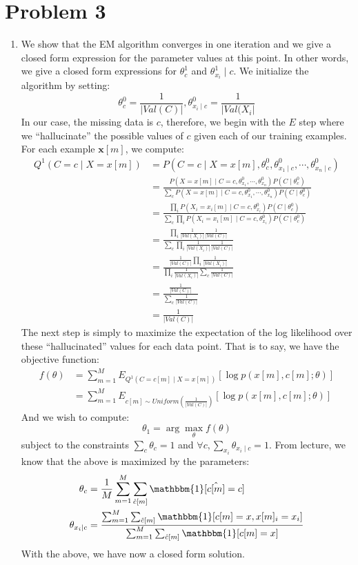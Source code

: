 \documentclass[12pt]{article}
\newcommand{\vect}[1]{\boldsymbol{#1}}
\begin{document}
\section*{Problem 3}

\begin{enumerate}[label=(\alph*)]
	\item We show that the EM algorithm converges in one iteration and we give a closed form expression for the parameter values at this point. In other words, we give a closed form expressions for $\theta_c^1$ and $\theta^1_{x_i} \mid c$. We initialize the algorithm by setting:
	$$
		\theta_c^0 = \frac{1}{|Val(C)|}, \theta_{x_i \mid c}^0 = \frac{1}{|Val(X_i|}
	$$
	In our case, the missing data is $c$, therefore, we begin with the $E$ step where we ``hallucinate'' the possible values of $c$ given each of our training examples. For each example $\vect{x}[m]$, we compute:
	\begin{align*}
		Q^1(C = c \mid X = x[m]) &= P(C = c \mid X = x[m], \theta^0_c, \theta^0_{x_1 \mid c}, \cdots, \theta^0_{x_n \mid c}) \\
		&= \frac{P(X = x[m] \mid C = c, \theta^0_{x_1}, \cdots,\theta^0_{x_n})P(C \mid \theta^0_c)}{\sum_{c} P(X = x[m] \mid C = c, \theta^0_{x_1}, \cdots, \theta^0_{x_n})P(C \mid \theta^0_c)} \tag{Bayes Rule and Conditional Independence} \\
		&= \frac{\prod_i P(X_i = x_i[m] \mid C = c, \theta^0_{x_i})P(C \mid \theta_c^0)}{\sum_c \prod_i P(X_i = x_i[m] \mid C = c, \theta^0_{x_i})P(C \mid \theta_c^0)} \\
		&= \frac{\prod_i \frac{1}{|Val(X_i)|} \frac{1}{|Val(C)|}}{\sum_c \prod_i \frac{1}{|Val(X_i)|} \frac{1}{|Val(C)|}} \\
		&= \frac{\frac{1}{|Val(C)|}\prod_i \frac{1}{|Val(X_i)|}}{\prod_i \frac{1}{|Val(X_i)|} \sum_c \frac{1}{|Val(C)|}} \\
		&= \frac{\frac{1}{|Val(C)|}}{\sum_c \frac{1}{|Val(C)|}} \\
		&= \frac{1}{|Val(C)|}
	\end{align*}
	The next step is simply to maximize the expectation of the log likelihood over these ``hallucinated'' values for each data point. That is to say, we have the objective function:
	\begin{align*}
		f(\theta) &= \sum_{m=1}^M E_{Q^1(C = c[m] \mid X = x[m])}[\log p(x[m], c[m]; \theta)] \\
		&= \sum_{m=1}^M E_{c[m] \sim Uniform(\frac{1}{|Val(C)|})}[\log p(x[m], c[m]; \theta)] 
	\end{align*}
	And we wish to compute:
	$$
		\theta_1 = \arg\max_{\theta} f(\theta)
	$$
	subject to the constraints $\sum_{c} \theta_c = 1$ and $\forall c, \sum_{x_i} \theta_{x_i \mid c} = 1$.
	From lecture, we know that the above is maximized by the parameters:
	\begin{align*}
		\theta_c &= 
		\frac{1}{M}\sum_{m=1}^M \sum_{\hat{c}[m]} \mathbbm{1}[\hat{c[m]} = c]
		\\
		\theta_{x_i \mid c} &= \frac{\sum_{m=1}^M \sum_{\hat{c}[m]} \mathbbm{1}[c[m] = x, x[m]_i = x_i] }{\sum_{m=1}^M \sum_{\hat{c}[m]} \mathbbm{1}[c[m] = x]}
	\end{align*}
	With the above, we have now a closed form solution.
\end{enumerate}
\end{document}
